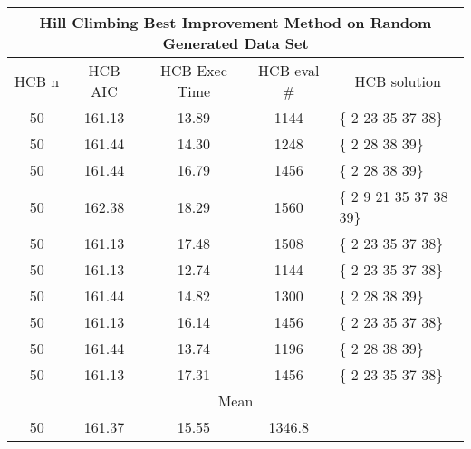 \begin{tabular}{|c|c|c|c|l|}
	\hline
	\multicolumn{5}{|c|}{Hill Climbing Best Improvement Method on Random Generated Data Set}              \\ \hline
	HCB n & HCB AIC     & HCB Exec Time & HCB eval \# & \multicolumn{1}{c|}{HCB solution} \\ \hline
	50    & 161.13 & 13.89             & 1144                   & \{ 2 23 35 37 38\}                \\ \hline
	50    & 161.44 & 14.30             & 1248                   & \{ 2 28 38 39\}                   \\ \hline
	50    & 161.44 & 16.79             & 1456                   & \{ 2 28 38 39\}                   \\ \hline
	50    & 162.38 & 18.29             & 1560                   & \{ 2 9 21 35 37 38 39\}           \\ \hline
	50    & 161.13 & 17.48             & 1508                   & \{ 2 23 35 37 38\}                \\ \hline
	50    & 161.13 & 12.74             & 1144                   & \{ 2 23 35 37 38\}                \\ \hline
	50    & 161.44 & 14.82             & 1300                   & \{ 2 28 38 39\}                   \\ \hline
	50    & 161.13 & 16.14             & 1456                   & \{ 2 23 35 37 38\}                \\ \hline
	50    & 161.44 & 13.74             & 1196                   & \{ 2 28 38 39\}                   \\ \hline
	50    & 161.13 & 17.31             & 1456                   & \{ 2 23 35 37 38\}                \\ \hline
	\multicolumn{5}{|c|}{Mean}                                                                            \\ \hline
	50    & 161.37 & 15.55            & 1346.8                 &                                   \\ \hline
\end{tabular}

